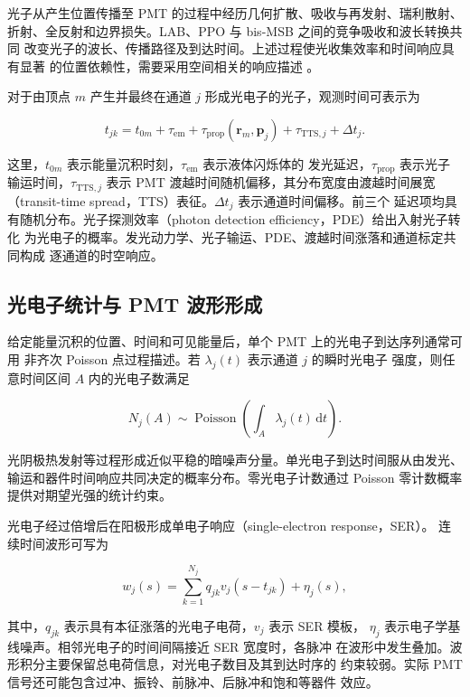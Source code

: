 \documentclass[UTF8,a4paper,11pt]{ctexart}
\begin{document}
光子从产生位置传播至 PMT 的过程中经历几何扩散、吸收与再发射、瑞利散射、
折射、全反射和边界损失。LAB、PPO 与 bis-MSB 之间的竞争吸收和波长转换共同
改变光子的波长、传播路径及到达时间。上述过程使光收集效率和时间响应具有显著
的位置依赖性，需要采用空间相关的响应描述
\cite{dou2023probe,zhang2020optics}。

对于由顶点 \(m\) 产生并最终在通道 \(j\) 形成光电子的光子，观测时间可表示为

\[
t_{jk}=t_{0m}+\tau_{\mathrm{em}}
       +\tau_{\mathrm{prop}}(\mathbf r_m,\mathbf p_j)
       +\tau_{\mathrm{TTS},j}+\Delta t_j.
\]

这里，\(t_{0m}\) 表示能量沉积时刻，\(\tau_{\mathrm{em}}\) 表示液体闪烁体的
发光延迟，\(\tau_{\mathrm{prop}}\) 表示光子输运时间，\(\tau_{\mathrm{TTS},j}\)
表示 PMT 渡越时间随机偏移，其分布宽度由渡越时间展宽
（transit-time spread，TTS）表征。\(\Delta t_j\) 表示通道时间偏移。前三个
延迟项均具有随机分布。光子探测效率（photon detection efficiency，PDE）给出入射光子转化
为光电子的概率。发光动力学、光子输运、PDE、渡越时间涨落和通道标定共同构成
逐通道的时空响应\cite{huang2023joint,li2021vertex}。

\subsection{光电子统计与 PMT 波形形成}

给定能量沉积的位置、时间和可见能量后，单个 PMT 上的光电子到达序列通常可用
非齐次 Poisson 点过程描述。若 \(\lambda_j(t)\) 表示通道 \(j\) 的瞬时光电子
强度，则任意时间区间 \(A\) 内的光电子数满足

\[
N_j(A)\sim\operatorname{Poisson}
\!\left(\int_A\lambda_j(t)\,\mathrm dt\right).
\]

光阴极热发射等过程形成近似平稳的暗噪声分量。单光电子到达时间服从由发光、
输运和器件时间响应共同决定的概率分布。零光电子计数通过 Poisson 零计数概率
提供对期望光强的统计约束\cite{liu2025tao}。

光电子经过倍增后在阳极形成单电子响应（single-electron response，SER）。
连续时间波形可写为

\[
w_j(s)=\sum_{k=1}^{N_j}q_{jk}v_j(s-t_{jk})+\eta_j(s),
\]

其中，\(q_{jk}\) 表示具有本征涨落的光电子电荷，\(v_j\) 表示 SER 模板，
\(\eta_j\) 表示电子学基线噪声。相邻光电子的时间间隔接近 SER 宽度时，各脉冲
在波形中发生叠加。波形积分主要保留总电荷信息，对光电子数目及其到达时序的
约束较弱。实际 PMT 信号还可能包含过冲、振铃、前脉冲、后脉冲和饱和等器件
效应\cite{jetter2012waveform,wang2026fsmp}。
\end{document}
